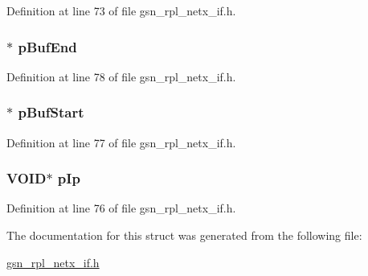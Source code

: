 Definition at line 73 of file gsn\_\-rpl\_\-netx\_\-if.h.

\hypertarget{a00207_aed7b3a60a222f1e6c2e1207b2d05aef7}{
\subsubsection[{pBufEnd}]{$\ast$ {\bf pBufEnd}}}
\label{a00207_aed7b3a60a222f1e6c2e1207b2d05aef7}


Definition at line 78 of file gsn\_\-rpl\_\-netx\_\-if.h.

\hypertarget{a00207_a714cd2aa6239909d5ceaf8b1e62f2f78}{
\subsubsection[{pBufStart}]{$\ast$ {\bf pBufStart}}}
\label{a00207_a714cd2aa6239909d5ceaf8b1e62f2f78}


Definition at line 77 of file gsn\_\-rpl\_\-netx\_\-if.h.

\hypertarget{a00207_a034966600aedf93f9197ac55b467812a}{
\subsubsection[{pIp}]{\setlength{\rightskip}{0pt plus 5cm}VOID$\ast$ {\bf pIp}}}
\label{a00207_a034966600aedf93f9197ac55b467812a}


Definition at line 76 of file gsn\_\-rpl\_\-netx\_\-if.h.



The documentation for this struct was generated from the following file:\begin{DoxyCompactItemize}
\item 
\hyperlink{a00580}{gsn\_\-rpl\_\-netx\_\-if.h}\end{DoxyCompactItemize}
